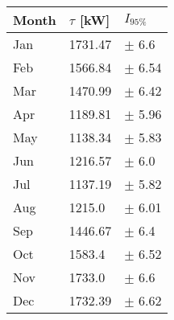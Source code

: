 \begin{tabular}{lll}
\toprule
Month & $\tau$ [kW] &   $I_{95\%}$ \\
\midrule
  Jan &     1731.47 &    $\pm$ 6.6 \\
  Feb &     1566.84 &   $\pm$ 6.54 \\
  Mar &     1470.99 &   $\pm$ 6.42 \\
  Apr &     1189.81 &   $\pm$ 5.96 \\
  May &     1138.34 &   $\pm$ 5.83 \\
  Jun &     1216.57 &    $\pm$ 6.0 \\
  Jul &     1137.19 &   $\pm$ 5.82 \\
  Aug &      1215.0 &   $\pm$ 6.01 \\
  Sep &     1446.67 &    $\pm$ 6.4 \\
  Oct &      1583.4 &   $\pm$ 6.52 \\
  Nov &      1733.0 &    $\pm$ 6.6 \\
  Dec &     1732.39 &   $\pm$ 6.62 \\
\bottomrule
\end{tabular}
